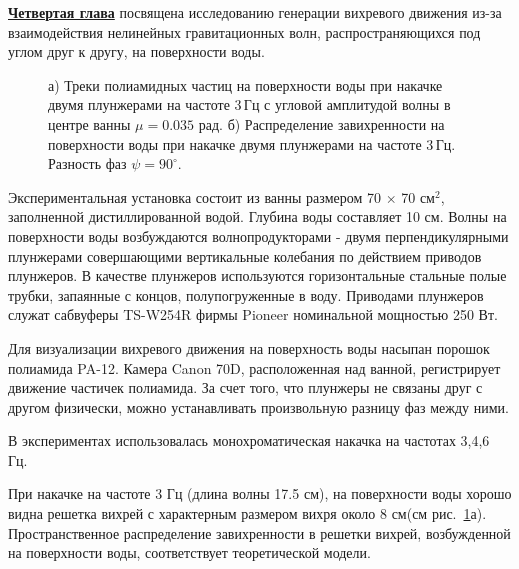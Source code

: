 \underline{\textbf{Четвертая глава}} посвящена исследованию генерации вихревого движения из-за взаимодействия нелинейных гравитационных волн, распространяющихся под углом друг к другу, на поверхности воды.

\begin{figure}[ht]
 \begin{minipage}[ht]{0.49\linewidth}
 \end{minipage}
 \hfill
 \begin{minipage}[ht]{0.49\linewidth}
 \end{minipage}
 \caption{а) Треки полиамидных частиц на поверхности воды при накачке двумя плунжерами на частоте 3\,Гц с угловой амплитудой волны в центре ванны $\mu = 0.035$ рад. б) Распределение завихренности на поверхности воды при накачке двумя плунжерами на частоте 3\,Гц. Разность фаз $\psi = 90^\circ$.}
 \label{img:vort_3Hz} 
\end{figure}
 
Экспериментальная установка состоит из ванны размером 70 $\times$ 70 см$^2$, заполненной дистиллированной водой. Глубина воды составляет 10 см. Волны на поверхности воды возбуждаются волнопродукторами - двумя перпендикулярными плунжерами совершающими вертикальные колебания по действием приводов плунжеров. В качестве плунжеров используются горизонтальные стальные полые трубки, запаянные с концов, полупогруженные в воду. Приводами плунжеров служат сабвуферы TS-W254R фирмы Pioneer номинальной мощностью 250 Вт. 


Для визуализации вихревого движения на поверхность воды насыпан порошок полиамида PA-12. Камера Canon 70D, расположенная над ванной, регистрирует движение частичек полиамида.
За счет того, что плунжеры не связаны друг с другом физически, можно устанавливать произвольную разницу фаз между ними.

В экспериментах использовалась монохроматическая накачка на частотах 3,4,6 Гц.

При накачке на частоте 3 Гц (длина волны 17.5 см), на поверхности воды хорошо видна решетка вихрей с характерным размером вихря около 8 см(см рис.~\ref{img:vort_3Hz}а). Пространственное распределение завихренности в решетки вихрей, возбужденной на поверхности воды, соответствует теоретической модели.

